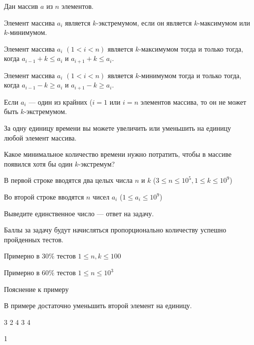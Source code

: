 
Дан массив $a$ из $n$ элементов.

Элемент массива $a_{i}$ является $k$-экстремумом, если он является $k$-максимумом или $k$-минимумом.

Элемент массива $a_{i}$ $(1 <  i <  n)$ является $k$-максимумом тогда и только тогда, 
когда $a_{i-1}+k \leq a_{i}$ и $a_{i+1} + k \leq a_i$.

Элемент массива $a_{i}$ $(1< i< n)$ является $k$-минимумом тогда и только тогда, когда 
$a_{i-1}-k \geq a_{i}$ и $a_{i+1}-k \geq a_{i}$.

Если $a_{i}$ — один из крайних ($i=1$ или $i=n$ элементов массива, то он не может быть $k$-экстремумом.

За одну единицу времени вы можете увеличить или уменьшить на единицу любой элемент массива.

Какое минимальное количество времени нужно потратить, чтобы в массиве появился хотя бы один $k$-экстремум?


В первой строке вводятся два целых числа $n$ и $k$ ($3 \leq n \leq 10^5, 1 \leq k \leq 10^9$)

Во второй строке вводятся $n$ чисел $a_i$ ($1 \leq a_i \leq 10^9$)

\outputfmtSection

Выведите единственное число — ответ на задачу.

\markSection

Баллы за задачу будут начисляться пропорционально количеству успешно пройденных тестов. 

Примерно в $30\%$  тестов $1 \leq n, k \leq 100$ 

Примерно в $60\%$ тестов $1 \leq n \leq 10^3$

Пояснение к примеру

В примере достаточно уменьшить второй элемент на единицу.




\begin{myverbbox}[\small]{\vinput}
    3 2
    4 3 4
\end{myverbbox}

\begin{myverbbox}[\small]{\voutput}
    1
\end{myverbbox}

